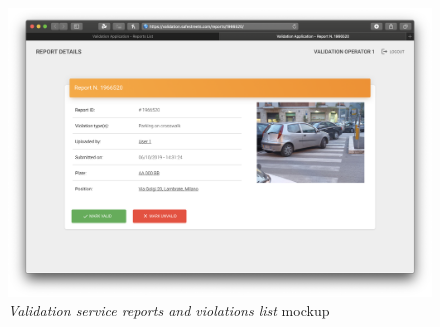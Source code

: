 \begin{figure}[ht!]
	\hspace*{-1cm}
	\centering
	\includegraphics[scale=0.3]{mockups/validationApp2.png}
	\caption{
		\label{fig:cc2} 
		\emph{Validation service reports and violations list} mockup
	}
\end{figure}